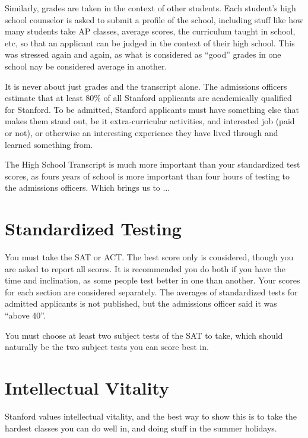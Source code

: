 \documentclass[12pt]{article}
\begin{document}
Similarly, grades are taken in the context of other students.
Each student's high school counselor is asked to submit a profile of the school,
including stuff like how many students take AP classes, average scores,
the curriculum taught in school, etc, so that an applicant can be judged
in the context of their high school. This was stressed again and again,
as what is considered as ``good'' grades in one school nay be considered average
in another. 

It is never about just grades and the transcript alone.
The admissions officers estimate that at least 80\% of all Stanford applicants
are academically qualified for Stanford. 
To be admitted, Stanford applicants must have something else that makes them
stand out, be it extra-curricular activities, 
and interested job (paid or not), or otherwise an interesting experience
they have lived through and learned something from. 

The High School Transcript is much more important than
your standardized test scores, as fours years of school is more
important than four hours of testing to the admissions officers.
Which brings us to $\ldots$


\section{Standardized Testing}

You must take the SAT or ACT. The best score only is considered,
though you are asked to report all scores.
It is recommended you do both if you have the time and inclination,
as some people test better in one than another.
Your scores for each section are considered separately.
The averages of standardized tests for admitted applicants is not published,
but the admissions officer said it was ``above 40''. 

You must choose at least two subject tests of the SAT to take,
which should naturally be the two subject tests you can score best in. 


\section{Intellectual Vitality}

Stanford values intellectual vitality, and the best way to show
this is to take the hardest classes you can do well in,
and doing stuff in the summer holidays.
\end{document}
